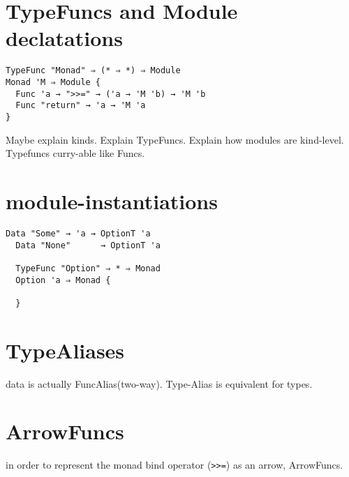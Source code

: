 \section*{TypeFuncs and Module declatations}
\begin{multicols}{2}
\begin{lstlisting}[caption=A generic monad transformer]
TypeFunc "Monad" ⇒ (* ⇒ *) ⇒ Module
Monad 'M ⇒ Module {
  Func 'a → ">>=" → ('a → 'M 'b) → 'M 'b
  Func "return" → 'a → 'M 'a
}
\end{lstlisting}
\columnbreak
Maybe explain kinds.
Explain TypeFuncs.
Explain how modules are kind-level.
Typefuncs curry-able like Funcs.
\end{multicols}

\section*{module-instantiations}
\begin{lstlisting}[caption=F\#'s option monad]
  Data "Some" → 'a → OptionT 'a
  Data "None"      → OptionT 'a

  TypeFunc "Option" ⇒ * ⇒ Monad
  Option 'a ⇒ Monad {
    
  }
\end{lstlisting}

\section*{TypeAliases}
data is actually FuncAlias(two-way). Type-Alias is equivalent for types.

\section*{ArrowFuncs}
in order to represent the monad bind operator (\texttt{>>=}) as an arrow, ArrowFuncs.
